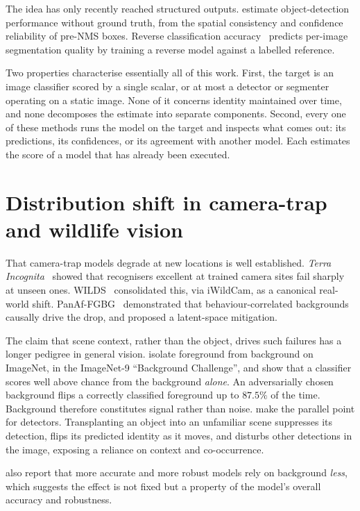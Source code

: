 The idea has only recently reached structured outputs. \citet{pcr} estimate object-detection performance
without ground truth, from the spatial consistency and confidence reliability of pre-NMS boxes. Reverse
classification accuracy~\cite{rca} predicts per-image segmentation quality by training a reverse model
against a labelled reference.

Two properties characterise essentially all of this work. First, the target is an image classifier scored by
a single scalar, or at most a detector or segmenter operating on a static image. None of it concerns identity
maintained over time, and none decomposes the estimate into separate components. Second, every one of these
methods runs the model on the target and inspects what comes out: its predictions, its confidences, or its
agreement with another model. Each estimates the score of a model that has already been executed.

\section{Distribution shift in camera-trap and wildlife vision}
\label{sec:bg-cameratrap}
That camera-trap models degrade at new locations is well established. \emph{Terra Incognita}~\cite{terra}
showed that recognisers excellent at trained camera sites fail sharply at unseen ones. WILDS~\cite{wilds}
consolidated this, via iWildCam, as a canonical real-world shift. PanAf-FGBG~\cite{panaf} demonstrated that
behaviour-correlated backgrounds causally drive the drop, and proposed a latent-space mitigation.

The claim that scene context, rather than the object, drives such failures has a longer pedigree in general
vision. \citet{xiao} isolate foreground from background on ImageNet, in the ImageNet-9 ``Background
Challenge'', and show that a classifier scores well above chance from the background \emph{alone}. An
adversarially chosen background flips a correctly classified foreground up to $87.5\%$ of the time.
Background therefore constitutes signal rather than noise. \citet{elephant} make the parallel point for detectors. Transplanting an object into an unfamiliar scene
suppresses its detection, flips its predicted identity as it moves, and disturbs other detections in the
image, exposing a reliance on context and co-occurrence.

\citet{xiao} also report that more accurate and more robust models rely on background \emph{less}, which
suggests the effect is not fixed but a property of the model's overall accuracy and robustness.

